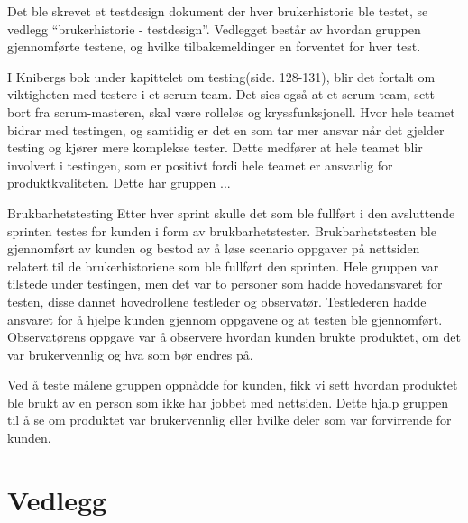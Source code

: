 \documentclass[12pt,a4paper,norsk]{article}
\begin{document}
Det ble skrevet et testdesign dokument der hver brukerhistorie ble testet, se vedlegg “brukerhistorie - testdesign”. Vedlegget består av hvordan gruppen gjennomførte testene, og hvilke tilbakemeldinger en forventet for hver test.

I Knibergs bok under kapittelet om testing(side. 128-131), blir det fortalt om viktigheten med testere i et scrum team. Det sies også at et scrum team, sett bort fra scrum-masteren, skal være rolleløs og kryssfunksjonell. Hvor hele teamet bidrar med testingen, og samtidig er det en som tar mer ansvar når det gjelder testing og kjører mere komplekse tester. Dette medfører at hele teamet blir involvert i testingen, som er positivt fordi hele teamet er ansvarlig for produktkvaliteten.
Dette har gruppen ...

Brukbarhetstesting
Etter hver sprint skulle det som ble fullført i den avsluttende sprinten testes for kunden i form av brukbarhetstester. Brukbarhetstesten ble gjennomført av kunden og bestod av å løse scenario oppgaver på nettsiden relatert til de brukerhistoriene som ble fullført den sprinten. Hele gruppen var tilstede under testingen, men det var to personer som hadde hovedansvaret for testen, disse dannet hovedrollene testleder og observatør. Testlederen hadde ansvaret for å hjelpe kunden gjennom oppgavene og at testen ble gjennomført. Observatørens oppgave var å observere hvordan kunden brukte produktet, om det var brukervennlig og hva som bør endres på.

Ved å teste målene gruppen oppnådde for kunden, fikk vi sett hvordan produktet ble brukt av en person som ikke har jobbet med nettsiden. Dette hjalp gruppen til å se om produktet var brukervennlig eller hvilke deler som var forvirrende for kunden. 

\newpage
{}
{}


\section{Vedlegg}

\end{document}
